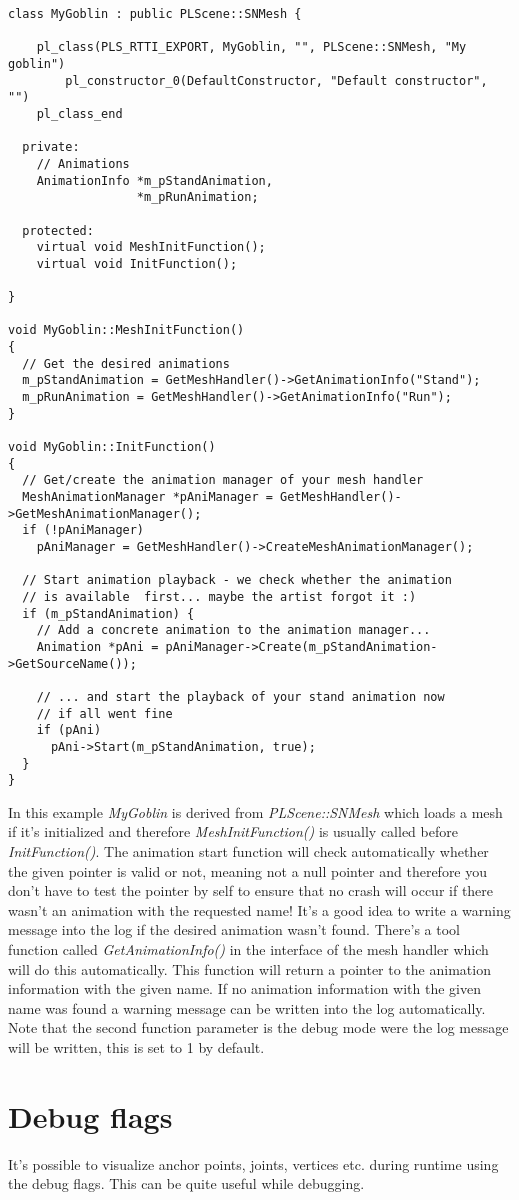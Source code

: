 \begin{lstlisting}[caption=Derived mesh scene node]
class MyGoblin : public PLScene::SNMesh {

	pl_class(PLS_RTTI_EXPORT, MyGoblin, "", PLScene::SNMesh, "My goblin")
		pl_constructor_0(DefaultConstructor, "Default constructor", "")
	pl_class_end

  private:
    // Animations
    AnimationInfo *m_pStandAnimation,
                  *m_pRunAnimation;

  protected:
    virtual void MeshInitFunction();
    virtual void InitFunction();

}

void MyGoblin::MeshInitFunction()
{
  // Get the desired animations
  m_pStandAnimation = GetMeshHandler()->GetAnimationInfo("Stand");
  m_pRunAnimation = GetMeshHandler()->GetAnimationInfo("Run");
}

void MyGoblin::InitFunction()
{
  // Get/create the animation manager of your mesh handler
  MeshAnimationManager *pAniManager = GetMeshHandler()->GetMeshAnimationManager();
  if (!pAniManager)
    pAniManager = GetMeshHandler()->CreateMeshAnimationManager();

  // Start animation playback - we check whether the animation
  // is available  first... maybe the artist forgot it :)
  if (m_pStandAnimation) {
    // Add a concrete animation to the animation manager...
    Animation *pAni = pAniManager->Create(m_pStandAnimation->GetSourceName());

    // ... and start the playback of your stand animation now
    // if all went fine
    if (pAni)
      pAni->Start(m_pStandAnimation, true);
  }
}
\end{lstlisting}

In this example \emph{MyGoblin} is derived from \emph{PLScene::SNMesh} which loads a mesh if it's initialized and therefore \emph{MeshInitFunction()} is usually called before \emph{InitFunction()}. The animation start function will check automatically whether the given pointer is valid or not, meaning not a null pointer and therefore you don't have to test the pointer by self to ensure that no crash will occur if there wasn't an animation with the requested name! It's a good idea to write a warning message into the log if the desired animation wasn't found. There's a tool function called \emph{GetAnimationInfo()} in the interface of the mesh handler which will do this automatically. This function will return a pointer to the animation information with the given name. If no animation information with the given name was found a warning message can  be written into the log automatically. Note that the second function parameter is the debug mode were the log message will be written, this is set to 1 by default.




\section{Debug flags}
It's possible to visualize anchor points, joints, vertices etc. during runtime using the debug flags. This can be quite useful while debugging.
